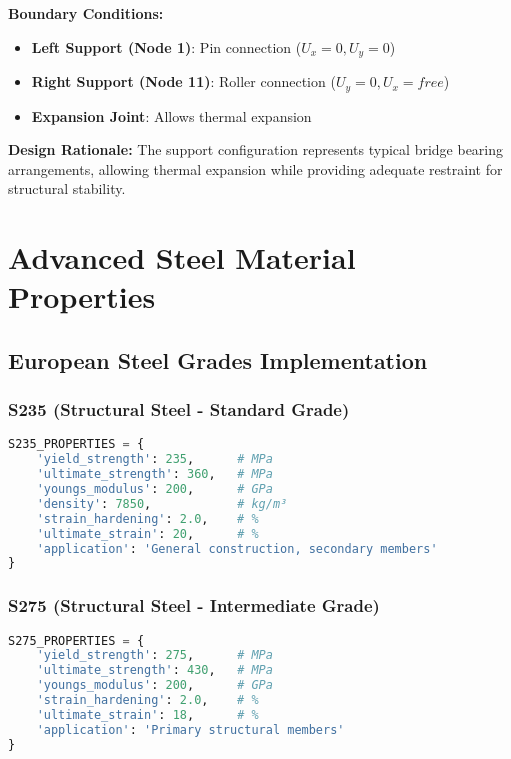 \documentclass[12pt,a4paper]{article}
\begin{document}
\textbf{Boundary Conditions:}
\begin{itemize}
    \item \textbf{Left Support (Node 1)}: Pin connection ($U_x=0, U_y=0$)
    \item \textbf{Right Support (Node 11)}: Roller connection ($U_y=0, U_x=free$)
    \item \textbf{Expansion Joint}: Allows thermal expansion
\end{itemize}

\textbf{Design Rationale:}
The support configuration represents typical bridge bearing arrangements, allowing thermal expansion while providing adequate restraint for structural stability.

\section{Advanced Steel Material Properties}

\subsection{European Steel Grades Implementation}

\subsubsection{S235 (Structural Steel - Standard Grade)}

\begin{lstlisting}[language=Python, caption=S235 Steel Properties]
S235_PROPERTIES = {
    'yield_strength': 235,      # MPa
    'ultimate_strength': 360,   # MPa
    'youngs_modulus': 200,      # GPa
    'density': 7850,            # kg/m³
    'strain_hardening': 2.0,    # %
    'ultimate_strain': 20,      # %
    'application': 'General construction, secondary members'
}
\end{lstlisting}

\subsubsection{S275 (Structural Steel - Intermediate Grade)}

\begin{lstlisting}[language=Python, caption=S275 Steel Properties]
S275_PROPERTIES = {
    'yield_strength': 275,      # MPa
    'ultimate_strength': 430,   # MPa
    'youngs_modulus': 200,      # GPa
    'strain_hardening': 2.0,    # %
    'ultimate_strain': 18,      # %
    'application': 'Primary structural members'
}
\end{lstlisting}
\end{document}
